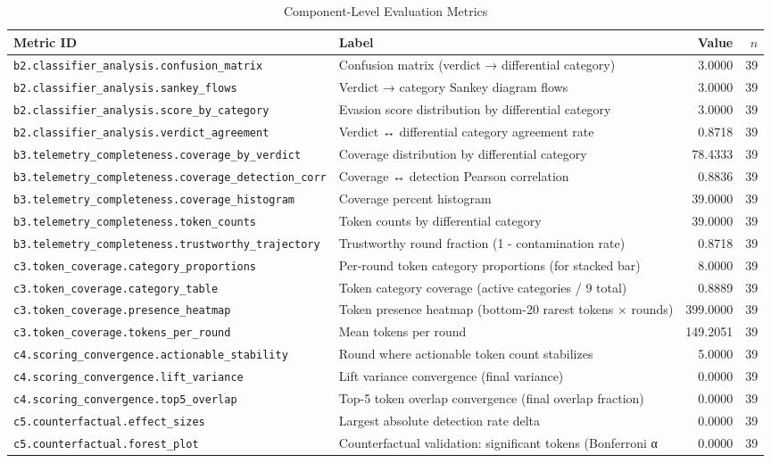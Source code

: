 \begin{table}[htbp]
\centering
\caption{Component-Level Evaluation Metrics}
\label{tab:component-metrics}
\begin{tabular}{llrr}
\toprule
Metric ID & Label & Value & $n$ \\
\midrule
\texttt{b2.classifier\_analysis.confusion\_matrix} & Confusion matrix (verdict → differential category) & 3.0000 & 39 \\
\texttt{b2.classifier\_analysis.sankey\_flows} & Verdict → category Sankey diagram flows & 3.0000 & 39 \\
\texttt{b2.classifier\_analysis.score\_by\_category} & Evasion score distribution by differential category & 3.0000 & 39 \\
\texttt{b2.classifier\_analysis.verdict\_agreement} & Verdict ↔ differential category agreement rate & 0.8718 & 39 \\
\midrule
\texttt{b3.telemetry\_completeness.coverage\_by\_verdict} & Coverage distribution by differential category & 78.4333 & 39 \\
\texttt{b3.telemetry\_completeness.coverage\_detection\_corr} & Coverage ↔ detection Pearson correlation & 0.8836 & 39 \\
\texttt{b3.telemetry\_completeness.coverage\_histogram} & Coverage percent histogram & 39.0000 & 39 \\
\texttt{b3.telemetry\_completeness.token\_counts} & Token counts by differential category & 39.0000 & 39 \\
\texttt{b3.telemetry\_completeness.trustworthy\_trajectory} & Trustworthy round fraction (1 - contamination rate) & 0.8718 & 39 \\
\midrule
\texttt{c3.token\_coverage.category\_proportions} & Per-round token category proportions (for stacked bar) & 8.0000 & 39 \\
\texttt{c3.token\_coverage.category\_table} & Token category coverage (active categories / 9 total) & 0.8889 & 39 \\
\texttt{c3.token\_coverage.presence\_heatmap} & Token presence heatmap (bottom-20 rarest tokens × rounds) & 399.0000 & 39 \\
\texttt{c3.token\_coverage.tokens\_per\_round} & Mean tokens per round & 149.2051 & 39 \\
\midrule
\texttt{c4.scoring\_convergence.actionable\_stability} & Round where actionable token count stabilizes & 5.0000 & 39 \\
\texttt{c4.scoring\_convergence.lift\_variance} & Lift variance convergence (final variance) & 0.0000 & 39 \\
\texttt{c4.scoring\_convergence.top5\_overlap} & Top-5 token overlap convergence (final overlap fraction) & 0.0000 & 39 \\
\midrule
\texttt{c5.counterfactual.effect\_sizes} & Largest absolute detection rate delta & 0.0000 & 39 \\
\texttt{c5.counterfactual.forest\_plot} & Counterfactual validation: significant tokens (Bonferroni α & 0.0000 & 39 \\
\bottomrule
\end{tabular}
\end{table}
